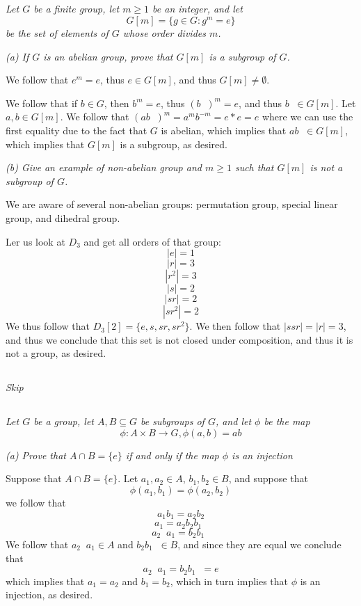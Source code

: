 \documentclass[11pt,oneside,titlepage]{book}
\DeclareMathOperator \inv {^{-1}}
\newcommand{\set}[1]{\{ #1 \}}
\begin{document}
\subsection{}

\textit{Let $G$ be a finite group, let $m \geq 1$ be an integer, and let
  $$G[m] = \set{g \in G: g^m = e}$$
  be the set of elements of $G$ whose order divides $m$. }

\textit{(a) If $G$ is an abelian group, prove that $G[m]$ is a subgroup of $G$.}

We follow that $e^m = e$, thus $e \in G[m]$, and thus $G[m] \neq
\emptyset$.

We follow that if $b \in G$, then $b^m = e$, thus $(b\inv)^m = e$, and
thus $b\inv \in G[m]$.  Let $a, b \in G[m]$. We follow that $(a b\inv
)^m = a^m b^{-m} = e * e = e$ where we can use the first equality due
to the fact that $G$ is abelian, which implies that $ab\inv \in G[m]$,
which implies that $G[m]$ is a subgroup, as desired.

\textit{(b) Give an example of non-abelian group and $m \geq 1$ such
  that $G[m]$ is not a subgroup of $G$.}

We are aware of several non-abelian groups: permutation group, special
linear group, and dihedral group.

Ler us look at $D_3$ and get all orders of that group:
$$|e| = 1$$
$$|r| = 3$$
$$|r^2| = 3$$
$$|s| = 2$$
$$|sr| = 2$$
$$|sr^2| = 2$$
We thus follow that $D_3[2] = \set{e, s, sr, sr^2}$. We then follow
that $|s sr| = |r| = 3$, and thus we conclude that this set is not
closed under composition, and thus it is not a group, as desired.

\subsection{}

\textit{Skip}

\subsection{}

\textit{Let $G$ be a group, let $A, B \subseteq G$ be subgroups of
  $G$, and let $\phi$ be the map
  $$\phi: A \times B \to G, \phi(a, b) = ab$$}

\textit{(a) Prove that $A \cap B = \set{e}$ if and only if the map $\phi$ is an injection}

Suppose that $A \cap B = \set{e}$. Let $a_1, a_2 \in A$, $b_1, b_2 \in
B$, and suppose that
$$\phi(a_1, b_1) = \phi(a_2, b_2)$$
we follow that
$$a_1 b_1 = a_2 b_2$$
$$a_1  = a_2 b_2 b_1\inv$$
$$a_2 \inv a_1  = b_2 b_1\inv$$
We follow that $a_2 \inv a_1 \in A$ and $b_2 b_1 \inv \in B$, and
since they are equal we conclude that
$$a_2 \inv a_1 = b_2 b_1\inv  = e$$
which implies that $a_1 = a_2$ and $b_1 = b_2$, which in turn implies
that $\phi$ is an injection, as desired.
\end{document}
